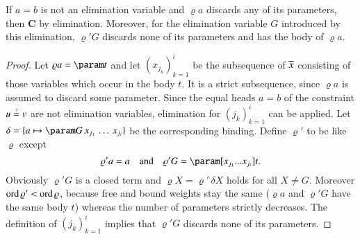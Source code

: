     \begin{lemma}
    [$\jp L9$]\label{lem:elimination}If $a=b$ is not an elimination variable and $\varrho a$
    discards any of its parameters, then \textbf{C} by elimination.
    Moreover, for the elimination variable $G$ introduced by this elimination,
    $\varrho'G$ discards none of its parameters and has the body of $\varrho a$.
    \end{lemma}
    \begin{proof}
    Let $\varrho a=\param t$ and let $(x_{j_{k}})_{k=1}^{i}$
    be the subsequence of $\overline{x}$ consisting of those variables which
    occur in the body $t$. It is a strict subsequence,\emph{ }since $\varrho a$
    is assumed to discard some parameter. Since the equal heads $a=b$ of the
    constraint $u\unif v$ are not elimination variables, elimination
    for $(j_{k})_{k=1}^{i}$ can be applied. Let $\delta=\{ a\mapsto\param G\,x_{j_{1}}\,\ldots\,x_{j_{i}}\} $
    be the corresponding binding. Define $\varrho'$ to be like $\varrho$
    except
    \[
    \varrho'a=a\quad\text{and}\quad\varrho'G=\param[x_{j_{1}}...x_{j_{i}}]t.
    \]
    Obviously $\varrho'G$ is a closed term and $\varrho X = \varrho'\,\delta X$
    holds for all $X \not= G$. Moreover $\operatorname{ord}\varrho'<\operatorname{ord}\varrho$, because
    free and bound weights stay the same ($\varrho a$ and $\varrho'G$ have the
    same body $t$) whereas the number of parameters strictly decreases. The definition
    of $\left(j_{k}\right)_{k=1}^{i}$ implies that $\varrho'G$ discards
    none of its parameters.
    \end{proof}

